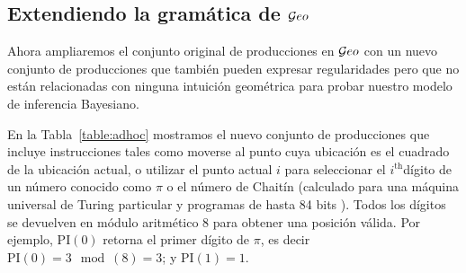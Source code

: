 \subsection{Extendiendo la gramática de $\mathcal Geo$}


Ahora ampliaremos el conjunto original de producciones en $\mathcal Geo$ con un nuevo conjunto de producciones que también pueden expresar regularidades pero que no están relacionadas con ninguna intuición geométrica para probar nuestro modelo de inferencia Bayesiano.


En la Tabla~\ref{table:adhoc} mostramos el nuevo conjunto de producciones que incluye instrucciones tales como moverse al punto cuya ubicación es el cuadrado de la ubicación actual, o utilizar el punto actual $i$ para seleccionar el $i^\text{th}$dígito de un número conocido como $\pi$ o el número de Chaitín (calculado para una máquina universal de Turing particular y programas de hasta 84 bits \cite{calude2002computing}). Todos los dígitos se devuelven en módulo aritmético 8 para obtener una posición válida. Por ejemplo, $\textrm{PI}(0)$ retorna el primer dígito de $\pi$, es decir $\textrm{PI}(0)= 3 \mod({8}) = 3$; y $\textrm{PI}(1) = 1$.

